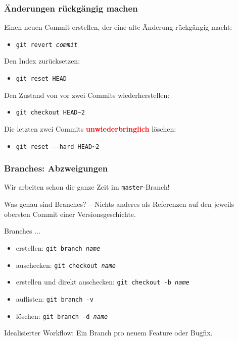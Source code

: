 \documentclass{beamer}
\begin{document}
\begin{frame}
 \frametitle{Änderungen rückgängig machen}



Einen neuen Commit erstellen, der eine alte Änderung rückgängig macht:
\begin{itemize}
	\item \texttt{git revert \emph{commit}}
\end{itemize}

Den Index zurücksetzen:
\begin{itemize}
	\item \texttt{git reset HEAD}
\end{itemize}

Den Zustand von vor zwei Commits wiederherstellen:
\begin{itemize}
	\item \texttt{git checkout HEAD\textasciitilde{}2}
\end{itemize}

Die letzten zwei Commits \textcolor{red}{\textbf{unwiederbringlich}} löschen:
\begin{itemize}
	\item \texttt{git reset -{}-hard HEAD\textasciitilde{}2}
\end{itemize}


 \end{frame}
\begin{frame}
 \frametitle{Branches: Abzweigungen}



Wir arbeiten schon die ganze Zeit im \texttt{master}-Branch!

\vspace{.5cm}


Was genau sind Branches? -- Nichts anderes als Referenzen auf den jeweils
obersten Commit einer Versionsgeschichte.

\vspace{.5cm}


Branches ...
\begin{itemize}
	\item erstellen: \texttt{git branch \emph{name}}
	\item auschecken: \texttt{git checkout \emph{name}}
	\item erstellen und direkt auschecken: \texttt{git checkout -b \emph{name}}
	\item auflisten: \texttt{git branch -v}
	\item löschen: \texttt{git branch -d \emph{name}}
\end{itemize}


\vspace{.5cm}

Idealisierter Workflow: Ein Branch pro neuem Feature oder Bugfix.


 \end{frame}
\end{document}
